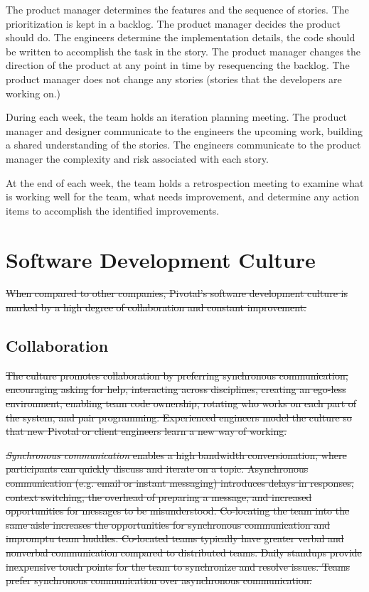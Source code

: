 The product manager determines the features and the sequence of stories. The prioritization is kept in a backlog. The product manager decides  the product should do. The engineers determine the implementation details,  the code should be written to accomplish the task in the story. The product manager changes the direction of the product at any point in time by resequencing the backlog. The product manager does not change any  stories (stories that the developers are working on.)


During each week, the team holds an iteration planning meeting. The product manager and designer communicate to the engineers the upcoming work, building a shared understanding of the stories. The engineers communicate to the product manager the complexity and risk associated with each story.


At the end of each week, the team holds a retrospection meeting to examine what is working well for the team, what needs improvement, and determine any action items to accomplish the identified improvements.






\section{Software Development Culture}
\sout{When compared to other companies, Pivotal's software development culture is marked by a high degree of collaboration and constant improvement.}


\subsection{Collaboration}
\sout{The culture promotes collaboration by preferring synchronous communication, encouraging asking for help, interacting across disciplines, creating an ego-less environment, enabling team code ownership, rotating who works on each part of the system, and pair programming. Experienced engineers model the culture so that new Pivotal or client engineers learn a new way of working.}


\sout{\textit{Synchronous communication} enables a high bandwidth conversionation, where participants can quickly discuss and iterate on a topic. Asynchronous communication (e.g. email or instant messaging) introduces delays in responses, context switching, the overhead of preparing a message, and increased opportunities for messages to be misunderstood. Co-locating the team into the same aisle increases the opportunities for synchronous communication and impromptu team huddles.  Co-located teams typically have greater verbal and nonverbal communication compared to distributed teams. Daily standups provide inexpensive touch points for the team to synchronize and resolve issues. Teams prefer synchronous communication over asynchronous communication. }



